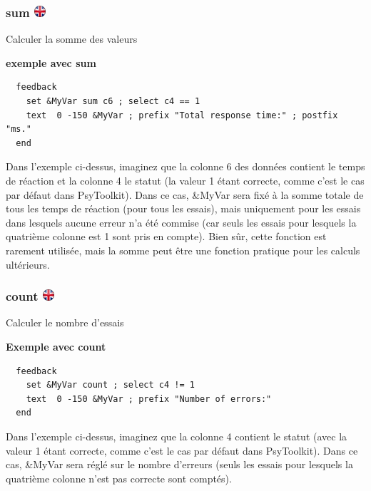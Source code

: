 \documentclass[
]{book}
\begin{document}
\hypertarget{sum-ukflag}{%
\subsubsection[sum ]{\texorpdfstring{sum
\href{https://www.psytoolkit.org/doc3.1.0/feedback.html\#_sum}{\protect\includegraphics{img/ukflag.png}}}{sum ukflag}}\label{sum-ukflag}}

Calculer la somme des valeurs

\textbf{exemple avec sum }

\begin{verbatim}
  feedback
    set &MyVar sum c6 ; select c4 == 1
    text  0 -150 &MyVar ; prefix "Total response time:" ; postfix "ms."
  end
\end{verbatim}

Dans l'exemple ci-dessus, imaginez que la colonne 6 des données contient
le temps de réaction et la colonne 4 le statut (la valeur 1 étant
correcte, comme c'est le cas par défaut dans PsyToolkit). Dans ce cas,
\&MyVar sera fixé à la somme totale de tous les temps de réaction (pour
tous les essais), mais uniquement pour les essais dans lesquels aucune
erreur n'a été commise (car seuls les essais pour lesquels la quatrième
colonne est 1 sont pris en compte). Bien sûr, cette fonction est
rarement utilisée, mais la somme peut être une fonction pratique pour
les calculs ultérieurs.

\hypertarget{count-ukflag}{%
\subsubsection[count ]{\texorpdfstring{count
\href{https://www.psytoolkit.org/doc3.1.0/feedback.html\#_count}{\protect\includegraphics{img/ukflag.png}}}{count ukflag}}\label{count-ukflag}}

Calculer le nombre d'essais

\textbf{Exemple avec count}

\begin{verbatim}
  feedback
    set &MyVar count ; select c4 != 1
    text  0 -150 &MyVar ; prefix "Number of errors:"
  end
\end{verbatim}

Dans l'exemple ci-dessus, imaginez que la colonne 4 contient le statut
(avec la valeur 1 étant correcte, comme c'est le cas par défaut dans
PsyToolkit). Dans ce cas, \&MyVar sera réglé sur le nombre d'erreurs
(seuls les essais pour lesquels la quatrième colonne n'est pas correcte
sont comptés).
\end{document}
